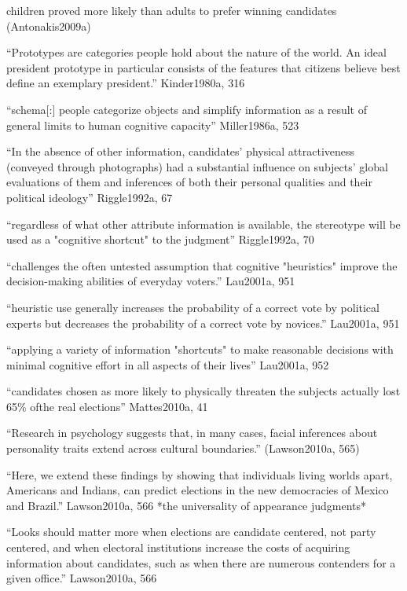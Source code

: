 	children proved more likely than adults to prefer winning candidates (Antonakis2009a)

``Prototypes are categories people hold about the nature of the world. An ideal president prototype in particular consists of the features that citizens believe best define an exemplary president.'' Kinder1980a, 316

``schema[:] people categorize objects and simplify information as a result of general limits to human cognitive capacity'' Miller1986a, 523

``In the absence of other information, candidates' physical attractiveness (conveyed through photographs) had a substantial influence on subjects' global evaluations of them and inferences of both their personal qualities and their political ideology'' Riggle1992a, 67

``regardless of what other attribute information is available, the stereotype will be used as a "cognitive shortcut" to the judgment'' Riggle1992a, 70

``challenges the often untested assumption that cognitive "heuristics" improve the decision-making abilities of everyday voters.'' Lau2001a, 951

``heuristic use generally increases the probability of a correct vote by political experts but decreases the probability of a correct vote by novices.'' Lau2001a, 951

``applying a variety of information "shortcuts" to make reasonable decisions with minimal cognitive effort in all aspects of their lives'' Lau2001a, 952


``candidates chosen as more likely to physically threaten the subjects actually lost 65\% ofthe real elections'' Mattes2010a, 41

``Research in psychology suggests that, in many cases, facial inferences about personality traits extend across cultural boundaries.'' (Lawson2010a, 565)

``Here, we extend these findings by showing that individuals living worlds apart, Americans and Indians, can predict elections in the new democracies of Mexico and Brazil.'' Lawson2010a, 566 *the universality of appearance judgments*

``Looks should matter more when elections are candidate centered, not party centered, and when electoral institutions increase the costs of acquiring information about candidates, such as when there are numerous contenders for a given office.'' Lawson2010a, 566

